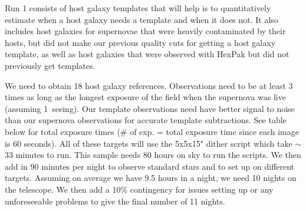\documentclass[11pt]{article}
\begin{document}
%

\technicaldescription

Run 1 consists of host galaxy templates that will help is to quantitatively estimate when a host galaxy needs a template and when it does not.
It also includes host galaxies for supernovae that were heavily contaminated by their hosts, but did not make our previous quality cuts for getting a host galaxy template, as well as host galaxies that were observed with HexPak but did not previously get templates.

We need to obtain 18 host galaxy references. 
Observations need to be at least 3 times as long as the longest exposure of the field when the supernova was live (assuming 1\arcsec\ seeing).
Our template observations need have better signal to noise than our supernova observations for accurate template subtractions. 
See table below for total exposure times ($\#$ of exp. = total exposure time since each image is 60 seconds).
All of these targets will use the 5x5x15" dither script which take $\sim$ 33 minutes to run.
This sample needs 80 hours on sky to run the scripts. 
We then add in 90 minutes per night to observe standard stars and to set up on different targets. 
Assuming on average we have 9.5 hours in a night, we need 10 nights on the telescope. 
We then add a 10$\%$ contingency for issues setting up or any unforeseeable problems to give the final number of 11 nights. 
\end{document}
